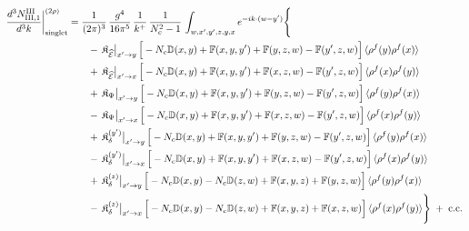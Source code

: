 \documentclass[9pt]{article}
\def\mf#1{\mathbb{#1}}
\numberwithin{equation}{section}
\begin{document}
{\begin{align}
\frac{d^{3}N^{\rm III}_{{\rm III},1}}{d^{3}k}\bigg|^{(2\rho)}_{\rm singlet}&=\frac{1}{(2\pi)^{3}}\,\frac{g^{4}}{16\pi^{5}}\,\frac{1}{k^{+}}\,\frac{1}{N_{c}^{2}-1}\,\int_{w,x',y',z,y,x}e^{-ik\cdot(w-y')}\Bigg\{\notag\\
&\qquad -\,\mathfrak{K}_{\widehat{\mathcal{E}}}\big|_{x'\to y}\,\Big[-N_{c}\mf{D}(x,y)+\mf{F}(x,y,y')+\mf{F}(y,z,w)-\mf{F}(y',z,w)\Big]\,\langle\rho^{f}(y)\rho^{f}(x)\rangle\notag\\
&\qquad +\,\mathfrak{K}_{\widehat{\mathcal{E}}}\big|_{x'\to x}\,\Big[-N_{c}\mf{D}(x,y)+\mf{F}(x,y,y')+\mf{F}(x,z,w)-\mf{F}(y',z,w)\Big]\,\langle\rho^{f}(x)\rho^{f}(y)\rangle\notag\\
&\qquad +\,\mathfrak{K}_{\Psi}\big|_{x'\to y}\,\Big[-N_{c}\mf{D}(x,y)+\mf{F}(x,y,y')+\mf{F}(y,z,w)-\mf{F}(y',z,w)\Big]\,\langle\rho^{f}(y)\rho^{f}(x)\rangle\notag\\
&\qquad -\,\mathfrak{K}_{\Psi}\big|_{x'\to x}\,\Big[-N_{c}\mf{D}(x,y)+\mf{F}(x,y,y')+\mf{F}(x,z,w)-\mf{F}(y',z,w)\Big]\,\langle\rho^{f}(x)\rho^{f}(y)\rangle\notag\\
&\qquad +\,\mathfrak{K}_{\delta}^{(y')}\big|_{x'\to y}\,\Big[-N_{c}\mf{D}(x,y)+\mf{F}(x,y,y')+\mf{F}(y,z,w)-\mf{F}(y',z,w)\Big]\,\langle\rho^{f}(y)\rho^{f}(x)\rangle\notag\\
&\qquad -\,\mathfrak{K}_{\delta}^{(y')}\big|_{x'\to x}\,\Big[-N_{c}\mf{D}(x,y)+\mf{F}(x,y,y')+\mf{F}(x,z,w)-\mf{F}(y',z,w)\Big]\,\langle\rho^{f}(x)\rho^{f}(y)\rangle\notag\\
&\qquad +\,\mathfrak{K}_{\delta}^{(z)}\big|_{x'\to y}\,\Big[-N_{c}\mf{D}(x,y)-N_{c}\mf{D}(z,w)+\mf{F}(x,y,z)+\mf{F}(y,z,w)\Big]\,\langle\rho^{f}(y)\rho^{f}(x)\rangle\notag\\
&\qquad -\,\mathfrak{K}_{\delta}^{(z)}\big|_{x'\to x}\,\Big[-N_{c}\mf{D}(x,y)-N_{c}\mf{D}(z,w)+\mf{F}(x,y,z)+\mf{F}(x,z,w)\Big]\,\langle\rho^{f}(x)\rho^{f}(y)\rangle\Bigg\}\;+\;{\rm c.c.}\label{eq:s-III-III-1}
\end{align}

}
\end{document}
